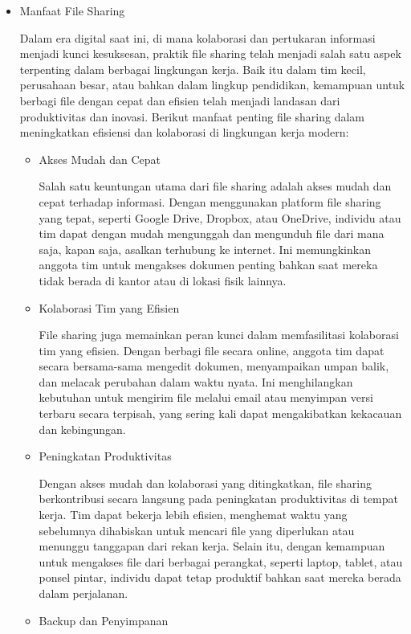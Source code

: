 \documentclass[12pt]{article}
\begin{document}
\begin{itemize}
    \item {Manfaat File Sharing} 
    
    Dalam era digital saat ini, di mana kolaborasi dan pertukaran informasi menjadi kunci kesuksesan, praktik file sharing telah menjadi salah satu aspek terpenting dalam berbagai lingkungan kerja. Baik itu dalam tim kecil, perusahaan besar, atau bahkan dalam lingkup pendidikan, kemampuan untuk berbagi file dengan cepat dan efisien telah menjadi landasan dari produktivitas dan inovasi.
    Berikut manfaat penting file sharing dalam meningkatkan efisiensi dan kolaborasi di lingkungan kerja modern:
    \begin{itemize}
       \item Akses Mudah dan Cepat 
       
        Salah satu keuntungan utama dari file sharing adalah akses mudah dan cepat terhadap informasi. Dengan menggunakan platform file sharing yang tepat, seperti Google Drive, Dropbox, atau OneDrive, individu atau tim dapat dengan mudah mengunggah dan mengunduh file dari mana saja, kapan saja, asalkan terhubung ke internet. Ini memungkinkan anggota tim untuk mengakses dokumen penting bahkan saat mereka tidak berada di kantor atau di lokasi fisik lainnya.
        \item Kolaborasi Tim yang Efisien

        File sharing juga memainkan peran kunci dalam memfasilitasi kolaborasi tim yang efisien. Dengan berbagi file secara online, anggota tim dapat secara bersama-sama mengedit dokumen, menyampaikan umpan balik, dan melacak perubahan dalam waktu nyata. Ini menghilangkan kebutuhan untuk mengirim file melalui email atau menyimpan versi terbaru secara terpisah, yang sering kali dapat mengakibatkan kekacauan dan kebingungan.
       \item Peningkatan Produktivitas 

       Dengan akses mudah dan kolaborasi yang ditingkatkan, file sharing berkontribusi secara langsung pada peningkatan produktivitas di tempat kerja. Tim dapat bekerja lebih efisien, menghemat waktu yang sebelumnya dihabiskan untuk mencari file yang diperlukan atau menunggu tanggapan dari rekan kerja. Selain itu, dengan kemampuan untuk mengakses file dari berbagai perangkat, seperti laptop, tablet, atau ponsel pintar, individu dapat tetap produktif bahkan saat mereka berada dalam perjalanan.
       \item Backup dan Penyimpanan
       

\end{itemize}
\end{itemize}
\end{document}
